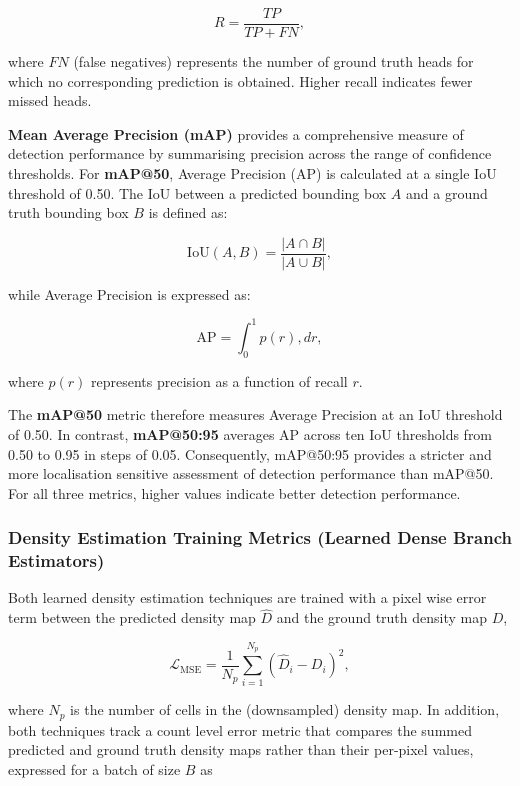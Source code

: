 \documentclass[12pt,a4paper]{report}
\begin{document}
\begin{equation}
	R = \frac{TP}{TP + FN},
\end{equation}

where $FN$ (false negatives) represents the number of ground truth heads for which no corresponding prediction is obtained. Higher recall indicates fewer missed heads.

\textbf{Mean Average Precision (mAP)} provides a comprehensive measure of detection performance by summarising precision across the range of confidence thresholds. For \textbf{mAP@50}, Average Precision (AP) is calculated at a single IoU threshold of 0.50. The IoU between a predicted bounding box $A$ and a ground truth bounding box $B$ is defined as:

\begin{equation}
	\text{IoU}(A,B) = \frac{|A \cap B|}{|A \cup B|},
\end{equation}

while Average Precision is expressed as:

\begin{equation}
	\text{AP} = \int_0^1 p(r),dr,
\end{equation}

where $p(r)$ represents precision as a function of recall $r$.

The \textbf{mAP@50} metric therefore measures Average Precision at an IoU threshold of 0.50. In contrast, \textbf{mAP@50:95} averages AP across ten IoU thresholds from 0.50 to 0.95 in steps of 0.05. Consequently, mAP@50:95 provides a stricter and more localisation sensitive assessment of detection performance than mAP@50. For all three metrics, higher values indicate better detection performance.

\subsubsection{Density Estimation Training Metrics (Learned Dense Branch Estimators)}

Both learned density estimation techniques are trained with a pixel wise error term between the predicted density map $\hat D$ and the ground truth density map $D$,

\begin{equation}
	\mathcal{L}_{\text{MSE}} = \frac{1}{N_p}\sum_{i=1}^{N_p}\left(\hat D_i - D_i\right)^2,
\end{equation}

where $N_p$ is the number of cells in the (downsampled) density map. In addition, both techniques track a count level error metric that compares the summed predicted and ground truth density maps rather than their per-pixel values, expressed for a batch of size $B$ as
\end{document}
